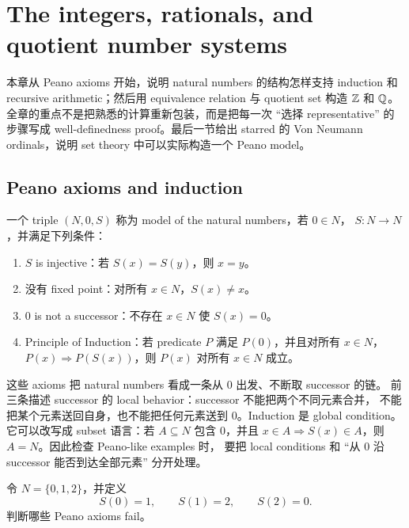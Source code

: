 \chapter{The integers, rationals, and quotient number systems}
\label{chap:integers-rationals}

本章从 Peano axioms 开始，说明 natural numbers 的结构怎样支持 induction 和
recursive arithmetic；然后用 equivalence relation 与 quotient set 构造
\(\mathbb{Z}\) 和 \(\mathbb{Q}\)。全章的重点不是把熟悉的计算重新包装，而是把每一次
``选择 representative'' 的步骤写成 well-definedness proof。最后一节给出
starred 的 Von Neumann ordinals，说明 set theory 中可以实际构造一个 Peano
model。

\section{Peano axioms and induction}

\begin{definition}
一个 triple \((N,0,S)\) 称为 model of the natural numbers，若 \(0\in N\)，
\(S:N\to N\)，并满足下列条件：
\begin{enumerate}
  \item \(S\) is injective：若 \(S(x)=S(y)\)，则 \(x=y\)。
  \item 没有 fixed point：对所有 \(x\in N\)，\(S(x)\neq x\)。
  \item \(0\) is not a successor：不存在 \(x\in N\) 使 \(S(x)=0\)。
  \item Principle of Induction：若 predicate \(P\) 满足 \(P(0)\)，并且对所有
  \(x\in N\)，\(P(x)\Rightarrow P(S(x))\)，则 \(P(x)\) 对所有 \(x\in N\) 成立。
\end{enumerate}
\end{definition}

这些 axioms 把 natural numbers 看成一条从 \(0\) 出发、不断取 successor 的链。
前三条描述 successor 的 local behavior：successor 不能把两个不同元素合并，
不能把某个元素送回自身，也不能把任何元素送到 \(0\)。Induction 是 global
condition。它可以改写成 subset 语言：若 \(A\subseteq N\) 包含 \(0\)，并且
\(x\in A\Rightarrow S(x)\in A\)，则 \(A=N\)。因此检查 Peano-like examples 时，
要把 local conditions 和 ``从 \(0\) 沿 successor 能否到达全部元素'' 分开处理。

\begin{exerciseblock}
令 \(N=\{0,1,2\}\)，并定义
\[
  S(0)=1,\qquad S(1)=2,\qquad S(2)=0.
\]
判断哪些 Peano axioms fail。
\end{exerciseblock}

